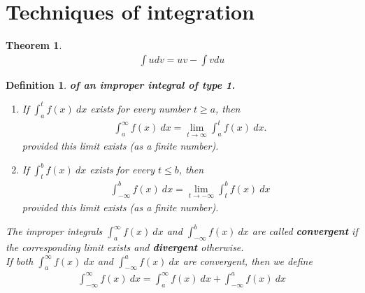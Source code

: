 \documentclass{article}
\theoremstyle{sltheorem}
\newtheorem{definition}{Definition}[section]
\newtheorem{theorem}{Theorem}[section]
\begin{document}
\section{Techniques of integration}
\begin{theorem}
    \begin{align*}
        \int u dv = uv - \int v du
    \end{align*}
\end{theorem}
\begin{definition}
    \textbf{of an improper integral of type 1.}
    \begin{enumerate}
        \item If $\int_a^t f(x)\:dx$ exists for every number $t\geq a$, then
        \begin{align*}
            \int_a^\infty f(x)\:dx = \lim_{t\to \infty}\int_a^t f(x)\:dx.
        \end{align*}
        provided this limit exists (as a finite number).
        \item If $\int_t^b f(x)\:dx$ exists for every $t\leq b$, then
        \begin{align*}
            \int_{-\infty}^b f(x)\: dx = \lim_{t\to-\infty}\int_t^b f(x)\:dx
        \end{align*}
        provided this limit exists (as a finite number).
    \end{enumerate}
    The improper integrals $\int_a^\infty f(x)\:dx$ and $\int_{-\infty}^b f(x)\:dx$ are called \textbf{convergent} if the corresponding limit exists and \textbf{divergent} otherwise.\\
    If both  $\int_a^\infty f(x)\:dx$ and $\int_{-\infty}^a f(x)\:dx$ are convergent, then we define
    \begin{align*}
        \int_{-\infty}^\infty f(x)\:dx = \int_a^\infty f(x)\:dx + \int_{-\infty}^a f(x)\:dx
    \end{align*}
\end{definition}
\end{document}
